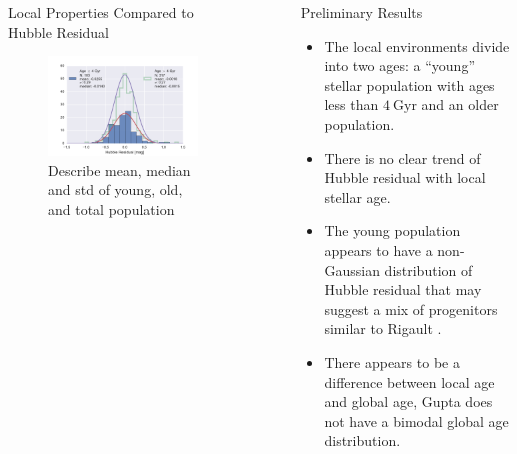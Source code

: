 \documentclass[final]{beamer}
\newlength{\sepwid}
\newlength{\onecolwid}
\begin{document}
\begin{frame}[t]
\begin{columns}[t]
\begin{column}{\onecolwid}
\begin{block}{Local Properties Compared to Hubble Residual}

\begin{figure}
    \centering
    \includegraphics[width=9.5in]{HR_double_hist.pdf}
    \caption{Describe mean, median and std of young, old, and total population}
    \label{fig:HR_hist}
\end{figure}
\end{block}


\end{column}


\begin{column}{\sepwid}\end{column}\label{rightspace}


\begin{column}{\onecolwid}\label{col3}

\begin{block}{Preliminary Results}
\begin{itemize}
    \item The  local environments divide into two ages: a ``young'' stellar population with ages less than $4~\text{Gyr}$ and an older population.
    \item There is no clear trend of Hubble residual with local stellar age.
    \item The young population appears to have a non-Gaussian distribution of Hubble residual that may suggest a mix of progenitors similar to Rigault \cite{Rigault13}.
    \item There appears to be a difference between local age and global age, Gupta does not have a bimodal global age distribution.%
\end{itemize}
\end{block}


\end{column}
\end{columns}
\end{frame}
\end{document}
